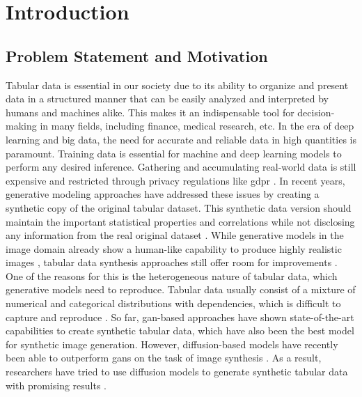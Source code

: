 \chapter{Introduction}
\label{ch:introduction}

\section{Problem Statement and Motivation}
\label{ch:intro-problemStatement}

Tabular data is essential in our society due to its ability to organize and present data in a structured manner
that can be easily analyzed and interpreted by humans and machines alike.
This makes it an indispensable tool for decision-making in many fields, including finance, medical research, etc.
In the era of deep learning and big data, the need for accurate and reliable data in high quantities is paramount.
Training data is essential for machine and deep learning \glspl{model} to perform any desired inference.
Gathering and accumulating real-world data is still expensive \cite{borisov2022DeepNeuralNetworks} and restricted through privacy regulations like \gls{gdpr}  \cite{european_commission_regulation_2016}.
In recent years, generative modeling approaches have addressed these issues by creating a synthetic copy of the original tabular dataset.
This synthetic data version should maintain the important statistical properties and correlations while not disclosing any information from the real original dataset \cite{goodfellow2020GenerativeAdversarialNetworks, mottini2018AirlinePassengerName}.
While generative models in the image domain already show a human-like capability to produce highly realistic images \cite{dhariwal2021DiffusionModelsBeat},
tabular data synthesis approaches still offer room for improvements \cite{chundawat2022UniversalMetricRobust}.
One of the reasons for this is the heterogeneous nature of tabular data, which generative models need to reproduce.
Tabular data usually consist of a mixture of numerical and categorical distributions with dependencies, which is difficult to capture and reproduce \cite{borisov2022DeepNeuralNetworks}.
So far, \acrfull{gan}-based approaches have shown state-of-the-art capabilities to create synthetic tabular data, which have also been the best \gls{model} for synthetic image generation.
However, diffusion-based models have recently been able to outperform \glspl{gan} on the task of image synthesis \cite{dhariwal2021DiffusionModelsBeat}.
As a result, researchers have tried to use diffusion models to generate synthetic tabular data with promising results \cite{kotelnikov2022TabDDPMModellingTabular, zheng2022DiffusionModelsMissing}.

